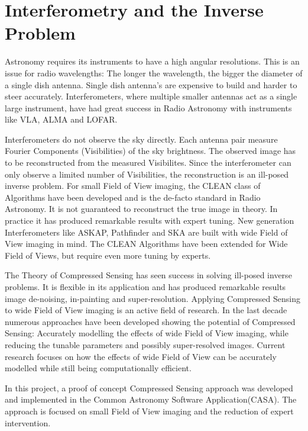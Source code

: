 
\section{Interferometry and the Inverse Problem}\label{intro}
Astronomy requires its instruments to have a high angular resolutions. This is an issue for radio wavelengths: The longer the wavelength, the bigger the diameter of a single dish antenna. Single dish antenna's are expensive to build and harder to steer accurately. Interferometers, where multiple smaller antennas act as a single large instrument, have had great success in Radio Astronomy with instruments like VLA, ALMA and LOFAR.

Interferometers do not observe the sky directly. Each antenna pair measure Fourier Components (Visibilities) of the sky brightness. The observed image has to be reconstructed from the measured Visibilites. Since the interferometer can only observe a limited number of Visibilities, the reconstruction is an ill-posed inverse problem. For small Field of View imaging, the CLEAN class of Algorithms\cite{hogbom1974aperture}\cite{schwab1984relaxing}\cite{rich2008multi}\cite{rau2011multi} have been developed and is the de-facto standard in Radio Astronomy. It is not guaranteed to reconstruct the true image in theory. In practice it has produced remarkable results with expert tuning. New generation Interferometers like ASKAP, Pathfinder and SKA are built with wide Field of View imaging in mind. The CLEAN Algorithms have been extended for Wide Field of Views, but require even more tuning by experts. 

The Theory of Compressed Sensing\cite{many} has seen success in solving ill-posed inverse problems. It is flexible in its application and has produced remarkable results image de-noising\cite{many}, in-painting\cite{many} and super-resolution\cite{many}. Applying Compressed Sensing to wide Field of View imaging is an active field of research. In the last decade numerous approaches have been developed showing the potential of Compressed Sensing: Accurately modelling the effects of wide Field of View imaging, while reducing the tunable parameters and possibly super-resolved images\cite{many}. Current research focuses on how the effects of wide Field of View can be accurately modelled while still being computationally efficient.

In this project, a proof of concept Compressed Sensing approach was developed and implemented in the Common Astronomy Software Application(CASA). The approach is focused on small Field of View imaging and the reduction of expert intervention.

